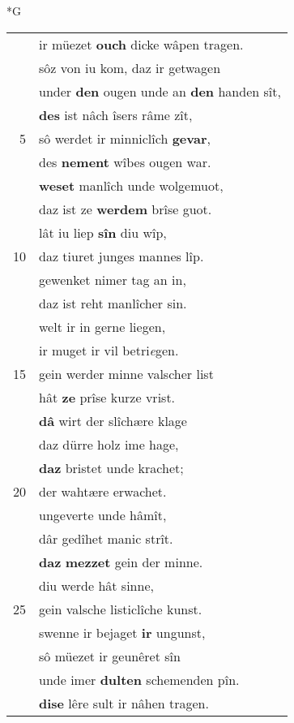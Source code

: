 \documentclass[8pt,a4paper,notitlepage]{article}
\begin{document}
\begin{table}[ht]
\begin{minipage}[t]{0.5\linewidth}
\small
\begin{center}*G
\end{center}
\begin{tabular}{rl}
 & ir müezet \textbf{ouch} dicke wâpen tragen.\\ 
 & sôz von iu kom, daz ir getwagen\\ 
 & under \textbf{den} ougen unde an \textbf{den} handen sît,\\ 
 & \textbf{des} ist nâch îsers râme zît,\\ 
5 & sô werdet ir minniclîch \textbf{gevar},\\ 
 & des \textbf{nement} wîbes ougen war.\\ 
 & \textbf{weset} manlîch unde wolgemuot,\\ 
 & daz ist ze \textbf{werdem} brîse guot.\\ 
 & lât iu liep \textbf{sîn} diu wîp,\\ 
10 & daz tiuret junges mannes lîp.\\ 
 & gewenket nimer tag an in,\\ 
 & daz ist reht manlîcher sin.\\ 
 & welt ir in gerne liegen,\\ 
 & ir muget ir vil betri\textit{e}gen.\\ 
15 & gein werder minne valscher list\\ 
 & hât \textbf{ze} prîse kurze vrist.\\ 
 & \textbf{dâ} wirt der slîchære klage\\ 
 & daz dürre holz ime hage,\\ 
 & \textbf{daz} bristet unde krachet;\\ 
20 & der wahtære erwachet.\\ 
 & ungeverte unde hâmît,\\ 
 & dâr gedîhet manic strît.\\ 
 & \textbf{daz} \textbf{mezzet} gein der minne.\\ 
 & diu werde hât sinne,\\ 
25 & gein valsche listiclîche kunst.\\ 
 & swenne ir bejaget \textbf{ir} ungunst,\\ 
 & sô müezet ir geunêret sîn\\ 
 & unde imer \textbf{dulten} schemenden pîn.\\ 
 & \textbf{dise} lêre sult ir nâhen tragen.\\ 

\end{tabular}
\end{minipage}
\end{table}
\end{document}
